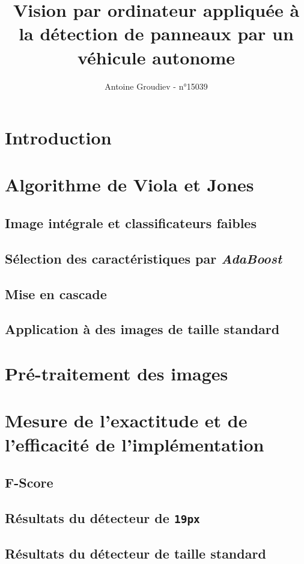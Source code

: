 \documentclass[12pt,a4paper]{article}
\author{Antoine Groudiev - n°15039}
\title{Vision par ordinateur appliquée à la détection de panneaux par un véhicule autonome}
\begin{document}
\maketitle

\section*{Introduction}

\section{Algorithme de Viola et Jones}
\subsection{Image intégrale et classificateurs faibles}

\subsection{Sélection des caractéristiques par \textit{AdaBoost}}

\subsection{Mise en cascade}

\subsection{Application à des images de taille standard}

\section{Pré-traitement des images}

\section{Mesure de l'exactitude et de l'efficacité de l'implémentation}
\subsection{F-Score}
\subsection{Résultats du détecteur de \texttt{19px}}
\subsection{Résultats du détecteur de taille standard}
\end{document}
